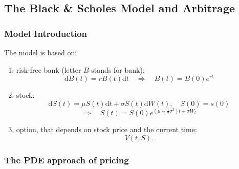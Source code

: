\documentclass[twocolumn,landscape,10pt]{article}
\theoremstyle{definition}
\begin{document}
\subsection{The Black \& Scholes Model and Arbitrage}

\subsubsection{Model Introduction}

The model is based on:
\begin{enumerate}
    \item risk-free bank (letter $B$ stands for bank): 
        \[
            \mathrm{d}B(t)=rB(t)\mathrm{d}t\quad\Rightarrow\quad
            B(t)=B(0)e^{rt}
        \]
    \item stock:
        \[
            \mathrm{d}S(t)=\mu S(t)\mathrm{d}t+\sigma S(t)\mathrm{d}W(t),\quad
            S(0)=s(0)
        \]
        \[
            \Rightarrow\quad
            S(t)=S(0)e^{\left(\mu-\frac{1}{2}\sigma^2\right)t+\sigma W_t}
        \]
    \item option, that depends on stock price and the current time:
        \[
            V(t,S).
        \]
\end{enumerate}

\subsubsection{The PDE approach of pricing}
\end{document}
